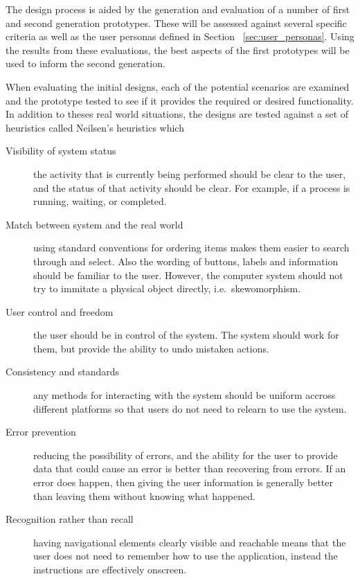 The design process is aided by the generation and evaluation of a number of
first and second generation prototypes. These will be assessed against several
specific criteria as well as the user personas defined in Section~%
\ref{sec:user_personas}. Using the results from these evaluations, the
best aspects of the first prototypes will be used to inform the second
generation.

When evaluating the initial designs, each of the potential scenarios are
examined and the prototype tested to see if it provides the required or desired
functionality. In addition to theses real world situations, the designs are
tested against a set of heuristics called Neilsen's heuristics which

\begin{description}

	\item[Visibility of system status] the activity that is currently being
		performed should be clear to the user, and the status of that activity
		should be clear. For example, if a process is running, waiting, or
		completed.

	\item[Match between system and the real world] using standard conventions
		for ordering items makes them easier to search through and select. Also
		the wording of buttons, labels and information should be familiar to
		the user. However, the computer system should not try to immitate a
		physical object directly, i.e.\ skewomorphism.

	\item[User control and freedom] the user should be in control of the
		system. The system should work for them, but provide the ability to
		undo mistaken actions.

	\item[Consistency and standards] any methods for interacting with the
		system should be uniform accross different platforms so that users do
		not need to relearn to use the system.

	\item[Error prevention] reducing the possibility of errors, and the ability
		for the user to provide data that could cause an error is better than
		recovering from errors. If an error does happen, then giving the user
		information is generally better than leaving them without knowing what
		happened.

	\item[Recognition rather than recall] having navigational elements clearly
		visible and reachable means that the user does not need to remember how
		to use the application, instead the instructions are effectively
		onscreen.


\end{description}
